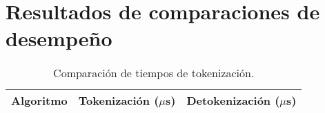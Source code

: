%
%
%

\section{Resultados de comparaciones de desempeño}

\begin{table}
  \begin{center}
    \begin{tabular}{|c|c|c|}
      \hline
      Algoritmo & Tokenización ($\mu$s) & Detokenización ($\mu$s) \\
      \hline
      
    \end{tabular}
    \caption{Comparación de tiempos de tokenización.}
    \label{tabla:tiempos_tokenizacion}
  \end{center}
\end{table}
